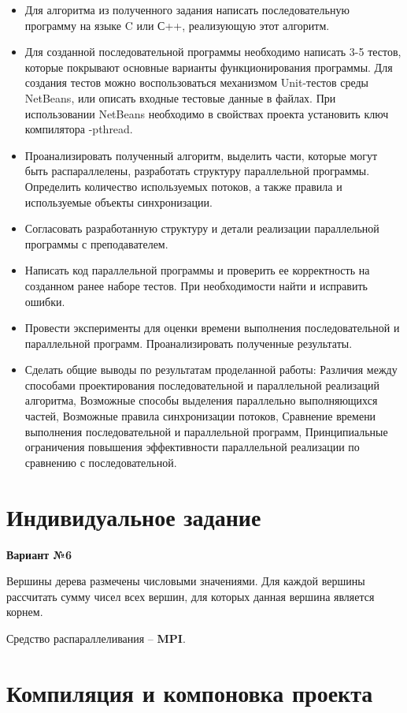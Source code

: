 \documentclass[14pt,a4paper,report]{report}
\begin{document}
\begin{itemize}
	\item Для алгоритма из полученного задания написать последовательную программу на языке C или С++, реализующую этот алгоритм.
	\item Для созданной последовательной программы необходимо написать 3-5 тестов, которые покрывают основные варианты функционирования программы. Для создания тестов можно воспользоваться механизмом Unit-тестов среды NetBeans, или описать входные тестовые данные в файлах. При использовании NetBeans необходимо в свойствах проекта установить ключ компилятора -pthread.
	\item Проанализировать полученный алгоритм, выделить части, которые могут быть распараллелены, разработать структуру параллельной программы. Определить количество используемых потоков, а также правила и используемые объекты синхронизации.
	\item Согласовать разработанную структуру и детали реализации параллельной программы с преподавателем.
	\item Написать код параллельной программы и проверить ее корректность на созданном ранее наборе тестов. При необходимости найти и исправить ошибки.
	\item Провести эксперименты для оценки времени выполнения последовательной и параллельной программ. Проанализировать полученные результаты.
	\item Сделать общие выводы по результатам проделанной работы: Различия между способами проектирования последовательной и параллельной реализаций алгоритма, Возможные способы выделения параллельно выполняющихся частей, Возможные правила синхронизации потоков, Сравнение времени выполнения последовательной и параллельной программ, Принципиальные ограничения повышения эффективности параллельной реализации по сравнению с последовательной.
\end{itemize}

\section{Индивидуальное задание}

\textbf{Вариант №6}

Вершины дерева размечены числовыми значениями. Для каждой вершины рассчитать сумму чисел всех вершин, для которых данная вершина является корнем.

Средство распараллеливания -- \textbf{MPI}.

\section{Компиляция и компоновка проекта}
\end{document}
